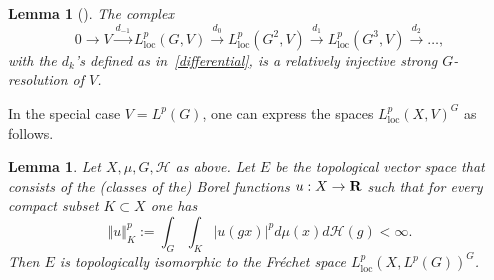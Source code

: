 \documentclass[11pt]{article}
\newtheorem{lemm}[theo]{Lemma}
\theoremstyle{definition}
\numberwithin{equation}{section}
\numberwithin{figure}{section}
\numberwithin{table}{section}
\DeclareMathOperator{\loc}{loc}
\begin{document}
\begin{lemm}[\cite{Bl}]\label{Blanc_lemma}
The complex 
\[
0 \to V \stackrel{d_{-1}}{\to} L_{\loc}^p(G, V) \stackrel{d_0}{\to} L_{\loc}^p(G^2, V)
\stackrel{d_1}{\to} L_{\loc}^p(G^3, V) \stackrel{d_2}{\to}\dots,
\]
with the $d_k$'s defined as in~\eqref{differential}, is a relatively injective strong $G$-resolution of $V$.
\end{lemm}

In the special case $V = L^p(G)$, one can express the spaces $L_{\loc}^p(X, V)^G$ as follows.

\begin{lemm}\label{cont_asymp_lemma}
Let $X,\mu, G, \mathcal H$ as above. Let
$E$ be the topological vector space that consists of the (classes of the) Borel functions $u: X \to {\bf R}$ such that for every compact subset $K \subset X$ one has
\[
\Vert u \Vert _K ^p:= \int_G \int_K \vert u(gx) \vert^p d\mu(x)d\mathcal H (g) < \infty.
\]
Then $E$ is topologically isomorphic to the Fréchet space $L_{\loc}^p\left(X, L^p(G)\right)^G$.
\end{lemm}
\end{document}
